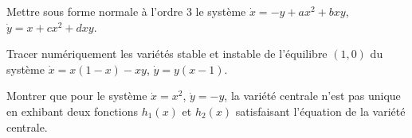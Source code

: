 \begin{exercice}
Mettre sous forme normale \`a l'ordre 3 le syst\`eme
$\dot{x} = -y + ax^2 + bxy$, $\dot{y} = x + cx^2 + dxy$.
\end{exercice}

\begin{exercice}
Tracer num\'eriquement les vari\'et\'es stable et instable de l'\'equilibre
$(1, 0)$ du syst\`eme $\dot{x} = x(1-x) - xy$, $\dot{y} = y(x - 1)$.
\end{exercice}

\begin{exercice}
Montrer que pour le syst\`eme $\dot{x} = x^2$, $\dot{y} = -y$, la vari\'et\'e
centrale n'est pas unique en exhibant deux fonctions $h_1(x)$ et $h_2(x)$
satisfaisant l'\'equation de la vari\'et\'e centrale.
\end{exercice}
